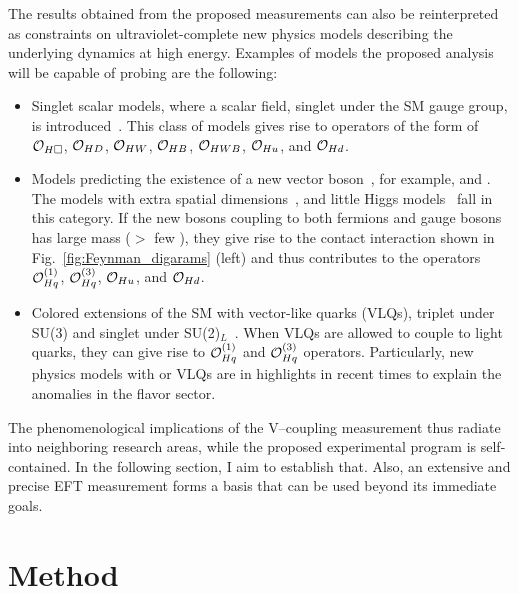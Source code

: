 \documentclass[a4paper,11pt]{article}
\renewcommand{\PV}{{{{V}}}\xspace}
\begin{document}
The results obtained from the proposed measurements can also be reinterpreted as constraints on ultraviolet-complete new physics models describing the underlying dynamics at high energy.
Examples of models the proposed analysis will be capable of probing are the following:
\begin{itemize}

\item Singlet scalar models, where a scalar field, singlet under the SM gauge group, is introduced~\cite{deBlas:2014mba,Profumo:2014opa}. This class of models gives rise to operators of the form of ${\cal O}_{H\square}$, ${\cal O}_{HD}$, ${\cal O}_{HW}$, ${\cal O}_{HB}$, ${\cal O}_{HWB}$, ${\cal O}_{Hu}$, and ${\cal O}_{Hd}$.

\item Models predicting the existence of a new vector boson~\cite{delAguila:2010mx}, for example, \PZprime and \PWprime. 
The models with extra spatial dimensions~\cite{Burdman:2006gy}, and little Higgs models~\cite{PhysRevD.10.275} fall in this category.
If the new bosons coupling to both fermions and gauge bosons has large mass ($>$ few \TeV), they give rise to the contact interaction shown in Fig.~\ref{fig:Feynman_digarams} (left) and thus contributes to the operators  ${\cal O}^{(1)}_{Hq}$, ${\cal O}^{(3)}_{Hq}$, ${\cal O}_{Hu}$, and ${\cal O}_{Hd}$. 

\item Colored extensions of the SM with vector-like quarks (VLQs), triplet under SU(3) and singlet under SU(2)$_L$~\cite{delAguila:2000aa,Dawson:2012di}. 
When VLQs are allowed to couple to light quarks, they can give rise to ${\cal O}^{(1)}_{Hq}$ and ${\cal O}^{(3)}_{Hq}$ operators.
Particularly, new physics models with \PZprime or VLQs are in highlights in recent times to explain the anomalies in the flavor sector. 

\end{itemize}

The phenomenological implications of the \PV--\PH coupling measurement thus radiate into neighboring research areas, while the proposed experimental program is self-contained.
In the following section, I aim to establish that. 
Also, an extensive and precise EFT measurement forms a basis that can be used beyond its immediate goals.

\section{Method}
\label{sec:method}
\end{document}
